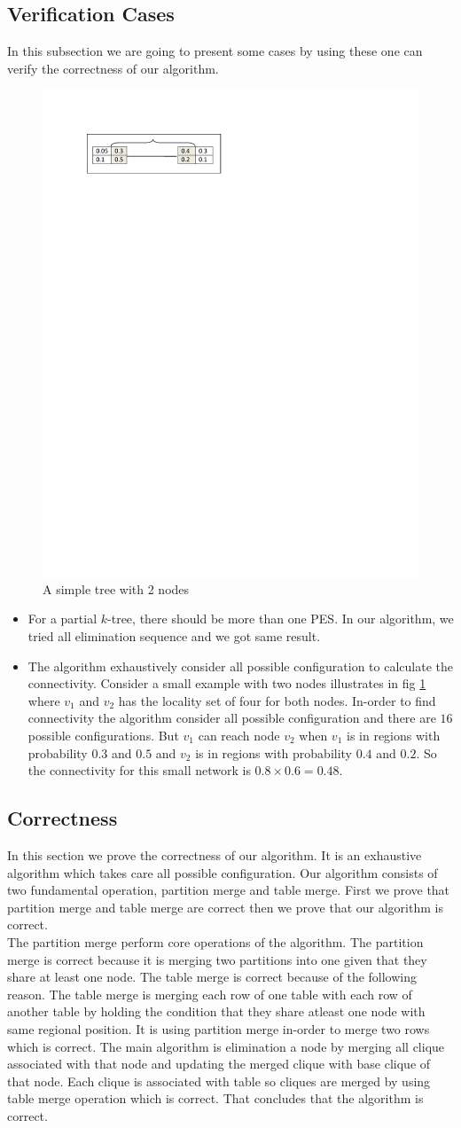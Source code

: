 \documentclass[12pt]{article}
\begin{document}
\subsection{Verification Cases}
\label{subsec:vc}
In this subsection we are going to present some cases by using these one can verify the correctness of our algorithm.
\begin{figure}

\begin{minipage}{.9\linewidth}
\includegraphics[width=3 in, height=.6 in]{verification.pdf}
\caption{A simple tree with 2 nodes}
\end{minipage}
\label{fig:var}
\end{figure}
\begin{itemize}
\item For a partial $k$-tree, there should be more than one PES. In our algorithm, we tried all elimination sequence and we got same result.
\item The algorithm exhaustively consider all possible configuration to calculate the connectivity. Consider a small example with two nodes illustrates in fig \ref{fig:var} where $v_1$ and $v_2$ has the locality set of four for both nodes. In-order to find connectivity the algorithm consider all possible configuration and there are $16$ possible configurations. But $v_1$ can reach node $v_2$ when $v_1$ is in regions with probability $0.3$ and $0.5$ and $v_2$ is in regions with probability $0.4$ and $0.2$. So the connectivity for this small network is $0.8 \times 0.6=0.48$.

\end{itemize}

\subsection{Correctness}
In this section we prove the correctness of our algorithm. It is an exhaustive algorithm which takes care all possible configuration.
Our algorithm consists of two fundamental operation, partition merge and table merge. First we prove that partition merge and table merge are correct then we prove that our algorithm is correct.\\
 The partition merge perform core operations of the algorithm. The partition merge is correct because it is merging two partitions into one given that they share at least one node. The table merge is correct because of the following reason. The table merge is merging each row of one table with each row of another table by holding the condition that they share atleast one node with same regional position. It is using partition merge in-order to merge two rows which is correct. The main algorithm is elimination a node by merging all clique associated with that node and updating the merged clique with base clique of that node. Each clique is associated with table so cliques are merged by using table merge operation which is correct. That concludes that the algorithm is correct.
\end{document}
